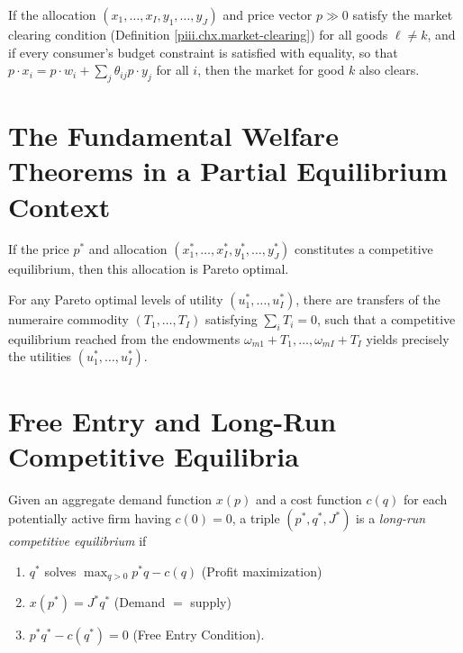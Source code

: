 \begin{lem}
    If the allocation $(x_1, \dots, x_I, y_1, \dots, y_J)$ and price vector $p \gg 0$ satisfy the market clearing condition (Definition \ref{piii.chx.market-clearing}) for all goods $\ell \neq k$, and if every consumer's budget constraint is satisfied with equality, so that $p \cdot x_i = p \cdot w_i + \sum_j \theta_{ij} p \cdot y_j$ for all $i$, then the market for good $k$ also clears.
\end{lem}


\addtocounter{section}{1}


\section{The Fundamental Welfare Theorems in a Partial Equilibrium Context}

\begin{prop}
    If the price $p^*$ and allocation $(x^*_1, \dots, x^*_I, y^*_1, \dots, y^*_J)$ constitutes a competitive equilibrium, then this allocation is Pareto optimal.
\end{prop}

\begin{prop}
    For any Pareto optimal levels of utility $(u^*_1, \dots, u^*_I)$, there are transfers of the numeraire commodity $(T_1, \dots, T_I)$ satisfying $\sum_i T_i = 0$, such that a competitive equilibrium reached from the endowments $\omega_{m1} + T_1, \dots, \omega_{mI} + T_I$ yields precisely the utilities $(u^*_1, \dots, u^*_I)$.
\end{prop}


\addtocounter{section}{1}


\section{Free Entry and Long-Run Competitive Equilibria}

\begin{defn}
    Given an aggregate demand function $x(p)$ and a cost function $c(q)$ for each potentially active firm having $c(0) = 0$, a triple $(p^*, q^*, J^*)$ is a \emph{long-run competitive equilibrium} if
    \begin{enumerate}
        \item $q^*$ solves $\max_{q > 0} p^* q - c(q)$ (Profit maximization)
        \item $x(p^*) = J^* q^*$ (Demand $=$ supply)
        \item $p^* q^* - c(q^*) = 0$ (Free Entry Condition).
    \end{enumerate} 
\end{defn}